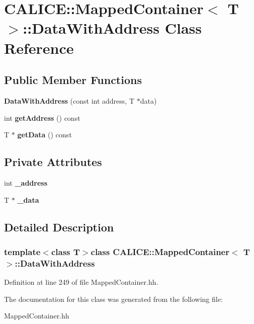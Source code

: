 \section{C\-A\-L\-I\-C\-E\-:\-:Mapped\-Container$<$ T $>$\-:\-:Data\-With\-Address Class Reference}
\label{classCALICE_1_1MappedContainer_1_1DataWithAddress}
\subsection*{Public Member Functions}
\begin{DoxyCompactItemize}
\item 
{\bfseries Data\-With\-Address} (const int address, T $\ast$data)\label{classCALICE_1_1MappedContainer_1_1DataWithAddress_ac7e3a4ba88ce83a52f8c8588e6e09f93}

\item 
int {\bfseries get\-Address} () const \label{classCALICE_1_1MappedContainer_1_1DataWithAddress_ad2f2af7218488e411b489579955b5abf}

\item 
T $\ast$ {\bfseries get\-Data} () const \label{classCALICE_1_1MappedContainer_1_1DataWithAddress_a9ac16b5083ddc5eb1768db68906583f5}

\end{DoxyCompactItemize}
\subsection*{Private Attributes}
\begin{DoxyCompactItemize}
\item 
int {\bfseries \-\_\-address}\label{classCALICE_1_1MappedContainer_1_1DataWithAddress_ab31d6a6ecdbf9cbbed05e7ba4d4204cc}

\item 
T $\ast$ {\bfseries \-\_\-data}\label{classCALICE_1_1MappedContainer_1_1DataWithAddress_a62a77e2b8874fd11ce0c8b065a4e369f}

\end{DoxyCompactItemize}


\subsection{Detailed Description}
\subsubsection*{template$<$class T$>$class C\-A\-L\-I\-C\-E\-::\-Mapped\-Container$<$ T $>$\-::\-Data\-With\-Address}



Definition at line 249 of file Mapped\-Container.\-hh.



The documentation for this class was generated from the following file\-:\begin{DoxyCompactItemize}
\item 
Mapped\-Container.\-hh\end{DoxyCompactItemize}
